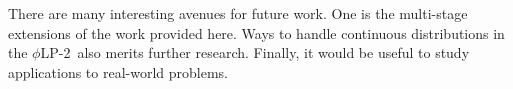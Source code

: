 \documentclass[ijoc,letterpaper]{informs3} %
\newcommand{\plp}{$\phi$LP-2}
\begin{document}
There are many interesting avenues for future work. 
One is the multi-stage extensions of the work provided here. 
Ways to handle continuous distributions in the \plp\ also merits further research. 
Finally, it would be useful to study applications to real-world problems.



%
\end{document}
